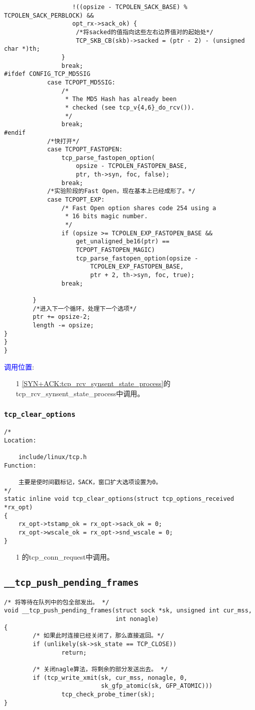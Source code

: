 \begin{verbatim}
				   !((opsize - TCPOLEN_SACK_BASE) % TCPOLEN_SACK_PERBLOCK) &&
				   opt_rx->sack_ok) {
					/*将sacked的值指向这些左右边界值对的起始处*/
					TCP_SKB_CB(skb)->sacked = (ptr - 2) - (unsigned char *)th;
				}
				break;
#ifdef CONFIG_TCP_MD5SIG
			case TCPOPT_MD5SIG:
				/*
				 * The MD5 Hash has already been
				 * checked (see tcp_v{4,6}_do_rcv()).
				 */
				break;
#endif
			/*快打开*/
			case TCPOPT_FASTOPEN:
				tcp_parse_fastopen_option(
					opsize - TCPOLEN_FASTOPEN_BASE,
					ptr, th->syn, foc, false);
				break;
			/*实验阶段的Fast Open，现在基本上已经成形了。*/
			case TCPOPT_EXP:
				/* Fast Open option shares code 254 using a
				 * 16 bits magic number.
				 */
				if (opsize >= TCPOLEN_EXP_FASTOPEN_BASE &&
					get_unaligned_be16(ptr) ==
					TCPOPT_FASTOPEN_MAGIC)
					tcp_parse_fastopen_option(opsize -
						TCPOLEN_EXP_FASTOPEN_BASE,
						ptr + 2, th->syn, foc, true);
				break;

		}
		/*进入下一个循环，处理下一个选项*/
		ptr += opsize-2;
		length -= opsize;
}
}
}
\end{verbatim}
		\textcolor{blue}{调用位置}:

			\begin{enumerate}
				\item[1]		\ref{SYN+ACK:tcp_rcv_synsent_state_process}的tcp\_rcv\_synsent\_state\_process中调用。
			\end{enumerate}
		\subsubsection{\texttt{tcp_clear_options}}
			\label{TCPOptions:tcp_clear_options}
\begin{verbatim}
/*
Location:

	include/linux/tcp.h
Function:
	
	主要是使时间戳标记，SACK，窗口扩大选项设置为0。
*/
static inline void tcp_clear_options(struct tcp_options_received *rx_opt)
{
	rx_opt->tstamp_ok = rx_opt->sack_ok = 0;
	rx_opt->wscale_ok = rx_opt->snd_wscale = 0;
}
\end{verbatim}

			\begin{enumerate}
				\item[1]		\label{Server:tcp_conn_request}的tcp\_conn\_request中调用。
			\end{enumerate}
    \subsection{\texttt{__tcp_push_pending_frames}}
\begin{verbatim}
/* 将等待在队列中的包全部发出。 */
void __tcp_push_pending_frames(struct sock *sk, unsigned int cur_mss,
                               int nonagle)
{
        /* 如果此时连接已经关闭了，那么直接返回。*/
        if (unlikely(sk->sk_state == TCP_CLOSE))
                return;

        /* 关闭nagle算法，将剩余的部分发送出去。 */
        if (tcp_write_xmit(sk, cur_mss, nonagle, 0,
                           sk_gfp_atomic(sk, GFP_ATOMIC)))
                tcp_check_probe_timer(sk);
}
\end{verbatim}
